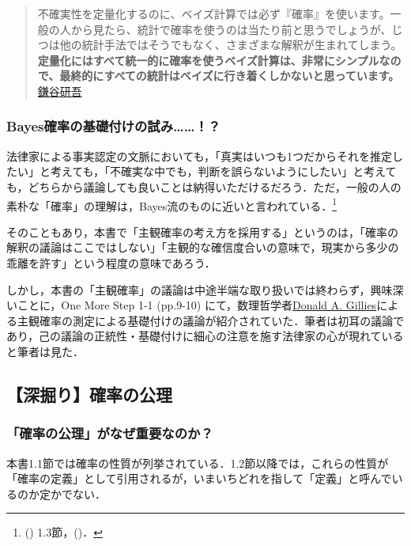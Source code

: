 \documentclass[
  letterpaper,
  DIV=11,
  numbers=noendperiod]{scrartcl}
\begin{document}
\begin{quote}
不確実性を定量化するのに、ベイズ計算では必ず『確率』を使います。一般の人から見たら、統計で確率を使うのは当たり前と思うでしょうが、じつは他の統計手法ではそうでもなく、さまざまな解釈が生まれてしまう。\textbf{定量化にはすべて統一的に確率を使うベイズ計算は、非常にシンプルなので、最終的にすべての統計はベイズに行き着くしかないと思っています。}
\href{https://www.ism.ac.jp/ism_info_j/labo/project/162.html}{鎌谷研吾}
\end{quote}

\subsubsection{Bayes確率の基礎付けの試み\ldots\ldots！？}\label{bayesux78baux7387ux306eux57faux790eux4ed8ux3051ux306eux8a66ux307f}

法律家による事実認定の文脈においても，「真実はいつも1つだからそれを推定したい」と考えても，「不確実な中でも，判断を誤らないようにしたい」と考えても，どちらから議論しても良いことは納得いただけるだろう．ただ，一般の人の素朴な「確率」の理解は，Bayes流のものに近いと言われている．\footnote{() 1.3節，()．}

そのこともあり，本書で「主観確率の考え方を採用する」というのは，「確率の解釈の議論はここではしない」「主観的な確信度合いの意味で，現実から多少の乖離を許す」という程度の意味であろう．

しかし，本書の「主観確率」の議論は中途半端な取り扱いでは終わらず，興味深いことに，One
More Step 1-1 (pp.9-10)
にて，数理哲学者\href{https://en.wikipedia.org/wiki/Donald_A._Gillies}{Donald
A.
Gillies}による主観確率の測定による基礎付けの議論が紹介されていた．筆者は初耳の議論であり，己の議論の正統性・基礎付けに細心の注意を施す法律家の心が現れていると筆者は見た．

\subsection{【深掘り】確率の公理}\label{sec-2}

\subsubsection{「確率の公理」がなぜ重要なのか？}\label{ux78baux7387ux306eux516cux7406ux304cux306aux305cux91cdux8981ux306aux306eux304b}

本書1.1節では確率の性質が列挙されている．1.2節以降では，これらの性質が「確率の定義」として引用されるが，いまいちどれを指して「定義」と呼んでいるのか定かでない．
\end{document}
